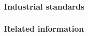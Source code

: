 \begin{frame}
\frametitle{Industrial standards}

\end{frame}

\begin{frame}
\frametitle{Related information}

\end{frame}
